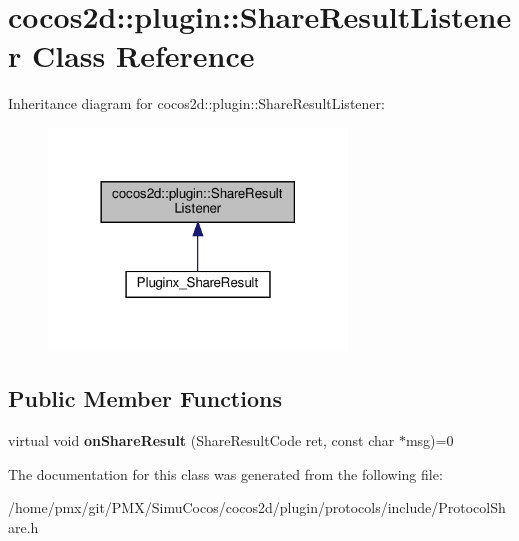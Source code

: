 \hypertarget{classcocos2d_1_1plugin_1_1ShareResultListener}{}\section{cocos2d\+:\+:plugin\+:\+:Share\+Result\+Listener Class Reference}
\label{classcocos2d_1_1plugin_1_1ShareResultListener}


Inheritance diagram for cocos2d\+:\+:plugin\+:\+:Share\+Result\+Listener\+:
\nopagebreak
\begin{figure}[H]
\begin{center}
\leavevmode
\includegraphics[width=225pt]{classcocos2d_1_1plugin_1_1ShareResultListener__inherit__graph}
\end{center}
\end{figure}
\subsection*{Public Member Functions}
\begin{DoxyCompactItemize}
\item 
\mbox{\label{classcocos2d_1_1plugin_1_1ShareResultListener_a3f8f1ec46f0323519a502a8784063fb0}} 
virtual void {\bfseries on\+Share\+Result} (Share\+Result\+Code ret, const char $\ast$msg)=0
\end{DoxyCompactItemize}


The documentation for this class was generated from the following file\+:\begin{DoxyCompactItemize}
\item 
/home/pmx/git/\+P\+M\+X/\+Simu\+Cocos/cocos2d/plugin/protocols/include/Protocol\+Share.\+h\end{DoxyCompactItemize}
